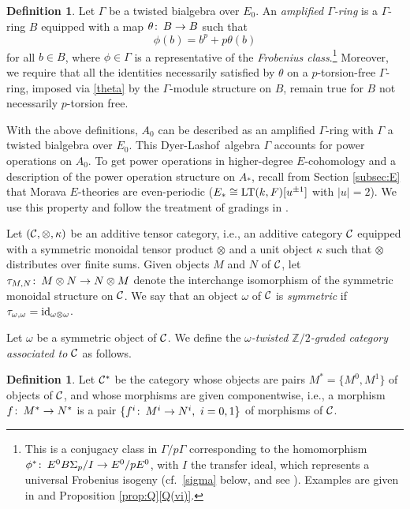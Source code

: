 \documentclass{gtpart}
\theoremstyle{definition}
\newtheorem{defn}[thm]{Definition}
\theoremstyle{remark}
\def\co{\colon\thinspace}
\newcommand{\mb}[1]{\mathbb{#1}}
\newcommand{\LT}{{\rm LT}}
\newcommand{\CC}{{\cal C}}
\newcommand{\DL}{Dyer-Lashof~}
\newcommand{\BZ}{{\mb Z}}
\newcommand{\id}{{\rm id}}
\newcommand{\G}{\Gamma}
\newcommand{\K}{\kappa}
\newcommand{\q}[1]{Proposition \ref{prop:Q}\thinspace \eqref{Q(#1)}}
\numberwithin{equation}{section}
\numberwithin{thm}{section}
\begin{document}
\begin{defn}
 Let $\G$ be a twisted bialgebra over $E_0$.  An {\em amplified 
 $\G$-ring} is a $\G$-ring $B$ equipped with a map $\theta \co B \to B$ 
 such that 
 \begin{equation}
 \label{theta}
  \phi (b) = b^p + p \theta (b) 
 \end{equation}
 for all $b \in B$, where $\phi \in \G$ is a representative of the 
 {\em Frobenius class}.\footnote{This is a conjugacy class in $\G/p\G$ 
 corresponding to the homomorphism 
 $\phi^* \co E^0 B\Sigma_p / I \to E^0 / p E^0$, with $I$ the transfer 
 ideal, which represents a universal Frobenius isogeny 
 (cf.~\eqref{sigma} below, and see \cite[10.3-5]{cong}).  Examples are 
 given in \cite[2.6]{h2p2} and \q{vi}.  }  Moreover, we require that all 
 the identities necessarily satisfied by $\theta$ on a $p$-torsion-free 
 $\G$-ring, imposed via \eqref{theta} by the $\G$-module structure on 
 $B$, remain true for $B$ not necessarily $p$-torsion free.  
\end{defn}

With the above definitions, $A_0$ can be described as an amplified 
$\G$-ring with $\G$ a twisted bialgebra over $E_0$.  This \DL algebra 
$\G$ accounts for power operations on $A_0$.  To get power operations in 
higher-degree $E$-cohomology and a description of the power operation 
structure on $A_*$, recall from Section \ref{subsec:E} that Morava 
$E$-theories are even-periodic ($E_* \cong \LT(k,F)[u^{\pm1}]$ with 
$|u| = 2$).  We use this property and follow the treatment of gradings 
in \cite[Section 2]{cong}.  

Let $(\CC, \otimes, \K)$ be an additive tensor category, i.e., an 
additive category $\CC$ equipped with a symmetric monoidal tensor 
product $\otimes$ and a unit object $\K$ such that $\otimes$ distributes 
over finite sums.  Given objects $M$ and $N$ of $\CC$, let 
$\tau_{M,N} \co M \otimes N \to N \otimes M$ denote the interchange 
isomorphism of the symmetric monoidal structure on $\CC$.  We say that 
an object $\omega$ of $\CC$ is {\em symmetric} if 
$\tau_{\omega,\omega} = \id_{\omega \otimes \omega}$.  

Let $\omega$ be a symmetric object of $\CC$.  We define the 
{\em $\omega$-twisted $\BZ/2$-graded category associated to $\CC$} as 
follows.  

\begin{defn}
 Let $\CC^*$ be the category whose objects are pairs 
 $M^* = \{ M^0, M^1 \}$ of objects of $\CC$, and whose morphisms are 
 given componentwise, i.e., a morphism $f \co M^* \to N^*$ is a pair 
 $\{ f^i \co M^i \to N^i, ~ i = 0, 1 \}$ of morphisms of $\CC$.  
\end{defn}
\end{document}
